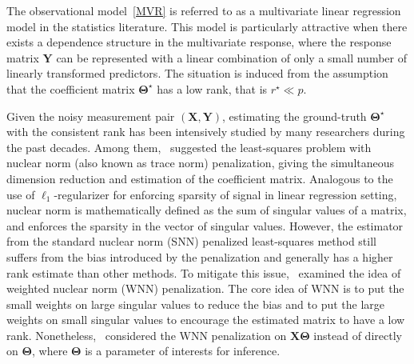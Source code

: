 \documentclass[alpha-refs]{wiley-article}
\begin{document}
The observational model~\eqref{MVR} is referred to as a multivariate linear regression model in the statistics literature.
This model is particularly attractive when there exists a dependence structure in the multivariate response, where the response matrix $\boldsymbol{Y}$ can be represented with a linear combination of only a small number of linearly transformed predictors.
The situation is induced from the assumption that the coefficient matrix $\boldsymbol{\Theta}^{\star}$ has a low rank, that is $r^{\star} \ll p$.

Given the noisy measurement pair $(\boldsymbol{X},\boldsymbol{Y})$, estimating the ground-truth $\boldsymbol{\Theta}^{\star}$ with the consistent rank has been intensively studied by many researchers during the past decades.
Among them,~\citet{yuan2007dimension} suggested the least-squares problem with nuclear norm (also known as trace norm) penalization, giving the simultaneous dimension reduction and estimation of the coefficient matrix.
Analogous to the use of $\ell_{1}$-regularizer for enforcing sparsity of signal in linear regression setting,
nuclear norm is mathematically defined as the sum of singular values of a matrix, and enforces the sparsity in the vector of singular values.
However, the estimator from the standard nuclear norm (SNN) penalized least-squares method still suffers from the bias introduced by the penalization and generally has a higher rank estimate than other methods.
To mitigate this issue,~\citet{chen2013reduced} examined the idea of weighted nuclear norm (WNN) penalization.
The core idea of WNN is to put the small weights on large singular values to reduce the bias and to put the large weights on small singular values to encourage the estimated matrix to have a low rank.
Nonetheless,~\citet{chen2013reduced} considered the WNN penalization on $\boldsymbol{X\Theta}$ instead of directly on $\boldsymbol{\Theta}$, where $\boldsymbol{\Theta}$ is a parameter of interests for inference.
\end{document}
